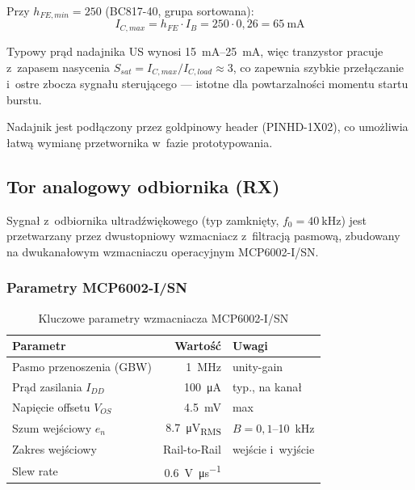 \documentclass[a4paper,11pt]{article}
\begin{document}
Przy $h_{FE,min} = 250$ (BC817-40, grupa sortowana):
\begin{equation}
    I_{C,max} = h_{FE} \cdot I_B = 250 \cdot 0{,}26 = \SI{65}{\milli\ampere}
    \label{eq:ic_max}
\end{equation}

Typowy prąd nadajnika US wynosi \SIrange{15}{25}{\milli\ampere}, więc
tranzystor pracuje z~zapasem nasycenia $S_{sat} = I_{C,max} / I_{C,load}
\approx 3$, co zapewnia szybkie przełączanie i~ostre zbocza sygnału
sterującego --- istotne dla powtarzalności momentu startu burstu.

Nadajnik jest podłączony przez goldpinowy header (PINHD-1X02), co
umożliwia łatwą wymianę przetwornika w~fazie prototypowania.

\subsection{Tor analogowy odbiornika (RX)}
\label{sec:tor_rx}

Sygnał z~odbiornika ultradźwiękowego (typ zamknięty, $f_0 = \SI{40}{\kilo\hertz}$)
jest przetwarzany przez dwustopniowy wzmacniacz z~filtracją pasmową, zbudowany
na dwukanałowym wzmacniaczu operacyjnym MCP6002-I/SN.

\subsubsection{Parametry MCP6002-I/SN}

\begin{table}[H]
    \centering
    \caption{Kluczowe parametry wzmacniacza MCP6002-I/SN}
    \label{tab:mcp6002}
    \begin{tabular}{lrl}
        \toprule
        \textbf{Parametr} & \textbf{Wartość} & \textbf{Uwagi} \\
        \midrule
        Pasmo przenoszenia (GBW) & \SI{1}{\mega\hertz} & unity-gain \\
        Prąd zasilania $I_{DD}$ & \SI{100}{\micro\ampere} & typ., na kanał \\
        Napięcie offsetu $V_{OS}$ & \SI{4,5}{\milli\volt} & max \\
        Szum wejściowy $e_n$ & \SI{8,7}{\micro\volt_{RMS}} & $B = 0{,}1$--\SI{10}{\kilo\hertz} \\
        Zakres wejściowy & Rail-to-Rail & wejście i~wyjście \\
        Slew rate & \SI{0,6}{\volt\per\micro\second} & \\
        \bottomrule
    \end{tabular}
\end{table}
\end{document}
